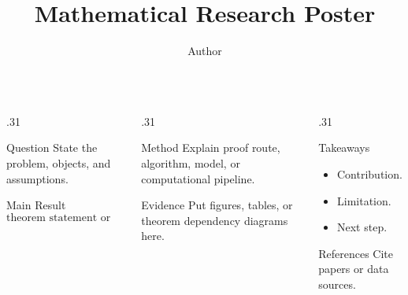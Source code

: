 \documentclass[final]{beamer}
\title{Mathematical Research Poster}
\author{Author}
\institute{Institution}
\begin{document}
\begin{frame}[t]
\begin{columns}[t]
\begin{column}{.31\textwidth}
  \begin{block}{Question}
    State the problem, objects, and assumptions.
  \end{block}
  \begin{block}{Main Result}
    \[
      \text{theorem statement or quantitative guarantee}
    \]
  \end{block}
\end{column}
\begin{column}{.31\textwidth}
  \begin{block}{Method}
    Explain proof route, algorithm, model, or computational pipeline.
  \end{block}
  \begin{block}{Evidence}
    Put figures, tables, or theorem dependency diagrams here.
  \end{block}
\end{column}
\begin{column}{.31\textwidth}
  \begin{block}{Takeaways}
    \begin{itemize}
      \item Contribution.
      \item Limitation.
      \item Next step.
    \end{itemize}
  \end{block}
  \begin{block}{References}
    Cite papers or data sources.
  \end{block}
\end{column}
\end{columns}
\end{frame}
\end{document}
